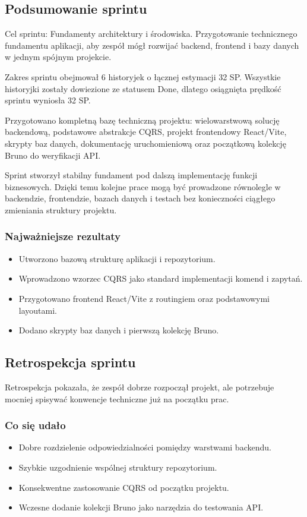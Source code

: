 \documentclass[12pt,a4paper]{article}
\begin{document}
\subsection*{Podsumowanie sprintu}
Cel sprintu: Fundamenty architektury i środowiska. Przygotowanie technicznego fundamentu aplikacji, aby zespół mógł rozwijać backend, frontend i bazy danych w jednym spójnym projekcie.

Zakres sprintu obejmował 6 historyjek o łącznej estymacji 32 SP. Wszystkie historyjki zostały dowiezione ze statusem Done, dlatego osiągnięta prędkość sprintu wyniosła 32 SP.

Przygotowano kompletną bazę techniczną projektu: wielowarstwową solucję backendową, podstawowe abstrakcje CQRS, projekt frontendowy React/Vite, skrypty baz danych, dokumentację uruchomieniową oraz początkową kolekcję Bruno do weryfikacji API.

Sprint stworzył stabilny fundament pod dalszą implementację funkcji biznesowych. Dzięki temu kolejne prace mogą być prowadzone równolegle w backendzie, frontendzie, bazach danych i testach bez konieczności ciągłego zmieniania struktury projektu.

\subsubsection*{Najważniejsze rezultaty}
\begin{itemize}
\item Utworzono bazową strukturę aplikacji i repozytorium.
\item Wprowadzono wzorzec CQRS jako standard implementacji komend i zapytań.
\item Przygotowano frontend React/Vite z routingiem oraz podstawowymi layoutami.
\item Dodano skrypty baz danych i pierwszą kolekcję Bruno.
\end{itemize}

\subsection*{Retrospekcja sprintu}
Retrospekcja pokazała, że zespół dobrze rozpoczął projekt, ale potrzebuje mocniej spisywać konwencje techniczne już na początku prac.

\subsubsection*{Co się udało}
\begin{itemize}
\item Dobre rozdzielenie odpowiedzialności pomiędzy warstwami backendu.
\item Szybkie uzgodnienie wspólnej struktury repozytorium.
\item Konsekwentne zastosowanie CQRS od początku projektu.
\item Wczesne dodanie kolekcji Bruno jako narzędzia do testowania API.
\end{itemize}
\end{document}
